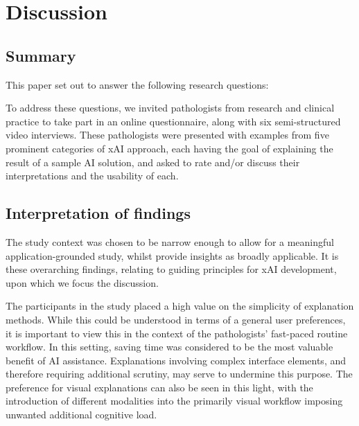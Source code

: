 \section{Discussion}
\label{sec:Discussion}

\subsection{Summary}
This paper set out to answer the following research questions:

\researchquestions

To address these questions, we invited pathologists from research and clinical practice to take part in an online questionnaire, along with six semi-structured video interviews. These pathologists were presented with examples from five prominent categories of xAI approach, each having the goal of explaining the result of a sample AI solution, and asked to rate and/or discuss their interpretations and the usability of each. 

\subsection{Interpretation of findings}

The study context was chosen to be narrow enough to allow for a meaningful application-grounded study, whilst provide insights as broadly applicable. It is these overarching findings, relating to guiding principles for xAI development, upon which we focus the discussion.

The participants in the study placed a high value on the simplicity of explanation methods. While this could be understood in terms of a general user preferences, it is important to view this in the context of the pathologists' fast-paced routine workflow. In this setting, saving time was considered to be the most valuable benefit of AI assistance. Explanations involving complex interface elements, and therefore requiring additional scrutiny, may serve to undermine this purpose. The preference for visual explanations can also be seen in this light, with the introduction of different modalities into the primarily visual workflow imposing unwanted additional cognitive load.



